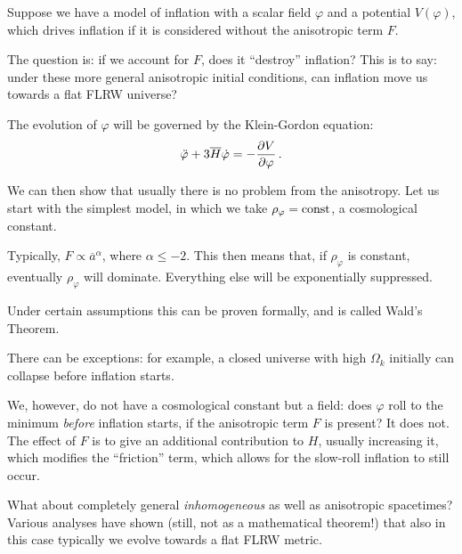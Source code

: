 \documentclass[main.tex]{subfiles}
\begin{document}
Suppose we have a model of inflation with a scalar field \(\varphi \) and a potential \(V(\varphi )\), which drives inflation if it is considered without the anisotropic term \(F\). 

The question is: if we account for \(F\), does it ``destroy'' inflation? 
This is to say: under these more general anisotropic initial conditions, can inflation move us towards a flat FLRW universe? 

The evolution of \(\varphi \) will be governed by the Klein-Gordon equation:
%
\begin{align}
\ddot{\varphi} + 3 \overline{H} \dot{\varphi} = - \pdv{V}{\varphi }
\,.
\end{align}

We can then show that usually there is no problem from the anisotropy. 
Let us start with the simplest model, in which we take \(\rho _\varphi = \text{const}\), a cosmological constant. 

Typically, \(F \propto \overline{a}^{\alpha }\), where \(\alpha \leq -2\). This then means that, if \(\rho _\varphi \) is constant, eventually \(\rho _\varphi \) will dominate. 
Everything else will be exponentially suppressed. 

Under certain assumptions this can be proven formally, and is called Wald's Theorem. 

There can be exceptions: for example, a closed universe with high \(\Omega _k\) initially can collapse before inflation starts. 

We, however, do not have a cosmological constant but a field: does \(\varphi \) roll to the minimum \emph{before} inflation starts, if the anisotropic term \(F\) is present?
It does not. The effect of \(F\) is to give an additional contribution to \(H\), usually increasing it, which modifies the ``friction'' term, which allows for the slow-roll inflation to still occur.

What about completely general \emph{inhomogeneous} as well as anisotropic spacetimes? 
Various analyses have shown (still, not as a mathematical theorem!) that also in this case typically we evolve towards a flat FLRW metric.
\end{document}
